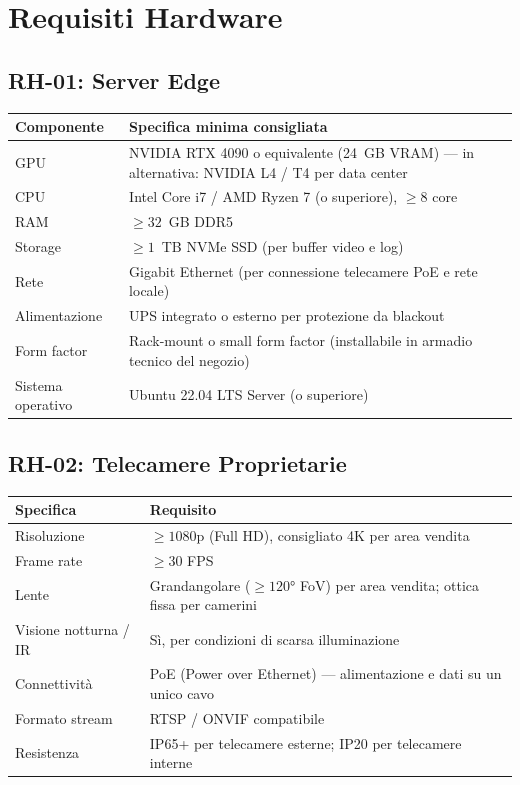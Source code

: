 \documentclass[a4paper, 12pt]{article}
\begin{document}
\section{Requisiti Hardware}

\subsection{RH-01: Server Edge}

\begin{tabularx}{\textwidth}{lL}
    \toprule
    \textbf{Componente} & \textbf{Specifica minima consigliata} \\
    \midrule
    GPU & NVIDIA RTX 4090 o equivalente (24~GB VRAM) — in alternativa: NVIDIA L4 / T4 per data center \\
    CPU & Intel Core i7 / AMD Ryzen 7 (o superiore), $\geq 8$ core \\
    RAM & $\geq 32$~GB DDR5 \\
    Storage & $\geq 1$~TB NVMe SSD (per buffer video e log) \\
    Rete & Gigabit Ethernet (per connessione telecamere PoE e rete locale) \\
    Alimentazione & UPS integrato o esterno per protezione da blackout \\
    Form factor & Rack-mount o small form factor (installabile in armadio tecnico del negozio) \\
    Sistema operativo & Ubuntu 22.04 LTS Server (o superiore) \\
    \bottomrule
\end{tabularx}

\subsection{RH-02: Telecamere Proprietarie}

\begin{tabularx}{\textwidth}{lL}
    \toprule
    \textbf{Specifica} & \textbf{Requisito} \\
    \midrule
    Risoluzione & $\geq 1080$p (Full HD), consigliato 4K per area vendita \\
    Frame rate & $\geq 30$ FPS \\
    Lente & Grandangolare ($\geq 120°$ FoV) per area vendita; ottica fissa per camerini \\
    Visione notturna / IR & Sì, per condizioni di scarsa illuminazione \\
    Connettività & PoE (Power over Ethernet) — alimentazione e dati su un unico cavo \\
    Formato stream & RTSP / ONVIF compatibile \\
    Resistenza & IP65+ per telecamere esterne; IP20 per telecamere interne \\
    \bottomrule
\end{tabularx}
\end{document}
